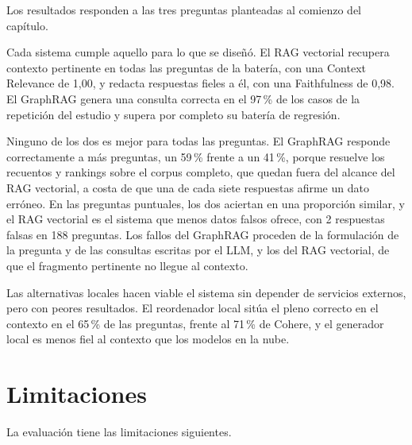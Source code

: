 \documentclass[11pt, a4paper]{report}
\begin{document}
	Los resultados responden a las tres preguntas planteadas al comienzo del
	capítulo.

	Cada sistema cumple aquello para lo que se diseñó. El RAG vectorial recupera
	contexto pertinente en todas las preguntas de la batería, con una Context
	Relevance de 1,00, y redacta respuestas fieles a él, con una Faithfulness de
	0,98. El GraphRAG genera una consulta correcta en el 97\,\% de los casos de la
	repetición del estudio y supera por completo su batería de regresión.

	Ninguno de los dos es mejor para todas las preguntas. El GraphRAG responde
	correctamente a más preguntas, un 59\,\% frente a un 41\,\%, porque resuelve los
	recuentos y rankings sobre el corpus completo, que quedan fuera del alcance
	del RAG vectorial, a costa de
	que una de cada siete respuestas afirme un dato erróneo. En las preguntas
	puntuales, los dos aciertan en una proporción similar, y el RAG vectorial es
	el sistema que menos datos falsos ofrece, con 2 respuestas falsas en 188
	preguntas. Los
	fallos del GraphRAG proceden de la formulación de la pregunta y de las
	consultas escritas por el LLM, y los del RAG vectorial, de que el fragmento
	pertinente no llegue al contexto.

	Las alternativas locales hacen viable el sistema sin depender de servicios
	externos, pero con peores resultados. El reordenador local sitúa el pleno
	correcto en el contexto en el 65\,\% de las preguntas, frente al 71\,\% de
	Cohere, y el generador local es menos fiel al contexto que los modelos en la
	nube.

	\section{Limitaciones}
	\label{sec:limitaciones}

	La evaluación tiene las limitaciones siguientes.
\end{document}
